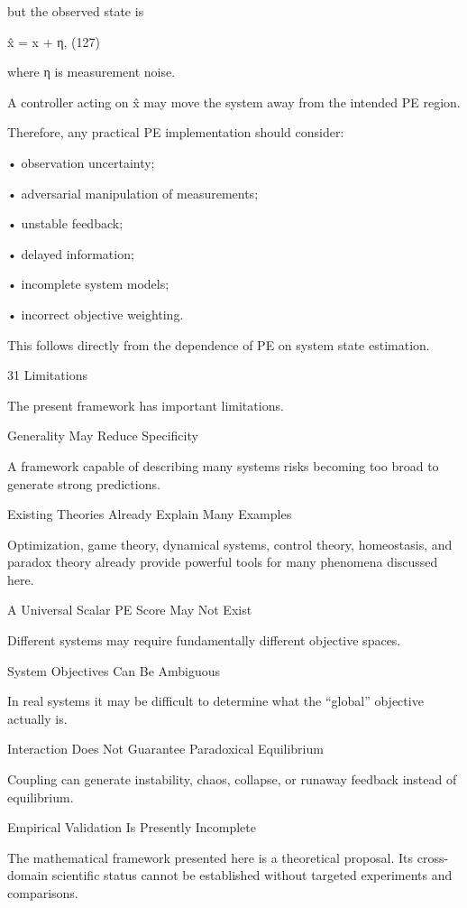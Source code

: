 \documentclass[10pt,a4paper]{article}
\begin{document}
\begin{ManuscriptText}
but the observed state is


                                            x̂ = x + η,                                  (127)

where η is measurement noise.

A controller acting on x̂ may move the system away from the intended PE region.

Therefore, any practical PE implementation should consider:


   • observation uncertainty;

   • adversarial manipulation of measurements;


  • unstable feedback;

  • delayed information;

  • incomplete system models;

  • incorrect objective weighting.


This follows directly from the dependence of PE on system state estimation.


31     Limitations

The present framework has important limitations.


Generality May Reduce Specificity

A framework capable of describing many systems risks becoming too broad to generate strong
predictions.


Existing Theories Already Explain Many Examples

Optimization, game theory, dynamical systems, control theory, homeostasis, and paradox theory
already provide powerful tools for many phenomena discussed here.


A Universal Scalar PE Score May Not Exist

Different systems may require fundamentally different objective spaces.


System Objectives Can Be Ambiguous

In real systems it may be difficult to determine what the “global” objective actually is.


Interaction Does Not Guarantee Paradoxical Equilibrium

Coupling can generate instability, chaos, collapse, or runaway feedback instead of equilibrium.


Empirical Validation Is Presently Incomplete

The mathematical framework presented here is a theoretical proposal. Its cross-domain scientific
status cannot be established without targeted experiments and comparisons.



\end{ManuscriptText}
\end{document}
